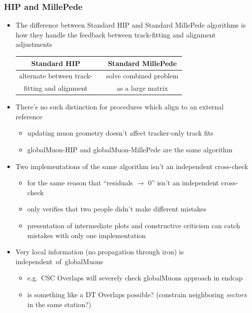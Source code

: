 \documentclass[compress]{beamer}
\begin{document}

\begin{frame}
\frametitle{HIP and MillePede}
\begin{itemize}
\item The difference between Standard HIP and Standard MillePede
  algorithms is how they handle the feedback between track-fitting and
  alignment adjustments

\begin{center}
\renewcommand{\arraystretch}{1.25}
\begin{tabular}{c p{1 cm} c}
Standard HIP & & Standard MillePede \\\hline
alternate between track- & & solve combined problem \\
fitting and alignment & & as a large matrix
\end{tabular}
\end{center}

\item There's no such distinction for procedures which align to an external reference
\begin{itemize}
\item \scriptsize updating muon geometry doesn't affect tracker-only track fits
\item \scriptsize globalMuon-HIP and globalMuon-MillePede are the same algorithm
\end{itemize}

\item Two implementations of the same algorithm isn't an independent cross-check
\begin{itemize}
\item \scriptsize for the same reason that ``residuals $\to$ 0'' isn't an independent cross-check
\item \scriptsize only verifies that two people didn't make different mistakes
\item \scriptsize presentation of intermediate plots and constructive criticism can catch mistakes with only one implementation
\end{itemize}

\item Very local information (no propagation through iron) is \mbox{independent of globalMuons\hspace{-1 cm}}
\begin{itemize}
\item \scriptsize e.g.\ CSC Overlaps will severely check globalMuons approach in endcap
\item \scriptsize is something like a DT Overlaps possible?  (constrain neighboring {\it sectors} in the same station?)
\end{itemize}


\end{itemize}
\end{frame}
\end{document}
